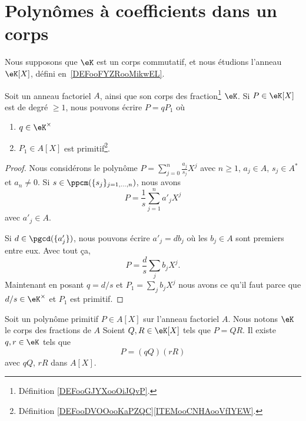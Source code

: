\section{Polynômes à coefficients dans un corps}
\label{SECooFYOGooQHitgE}

Nous supposons que \( \eK\) est un corps commutatif, et nous étudions l'anneau \( \eK[X]\), défini en~\ref{DEFooFYZRooMikwEL}.


\begin{lemma}		\label{LEMooKSTIooSTxAll}
	Soit un anneau factoriel \( A\), ainsi que son corps des fraction\footnote{Définition \ref{DEFooGJYXooOiJQvP}.} \( \eK\). Si \( P\in \eK[X]\) est de degré \( \geq 1\), nous pouvons écrire \( P=qP_1\) où
	\begin{enumerate}
		\item
		      \( q\in \eK^{\times}\)
		\item
		      \( P_1\in A[X]\) est primitif\footnote{Définition \ref{DEFooDVOOooKaPZQC}\ref{ITEMooCNHAooVfIYEW}.}.
	\end{enumerate}
\end{lemma}

\begin{proof}
	Nous considérons le polynôme \( P=\sum_{j=0}^n\frac{ a_j }{ s_j }X^j\) avec \( n\geq 1\), \( a_j\in A\), \( s_j\in A^*\) et \( a_n\neq 0\). Si \( s\in \ppcm(\{ s_j \}_{j=1,\ldots,n})\), nous avons
	\begin{equation}
		P=\frac{1}{ s}\sum_{j=1}^na'_jX^j
	\end{equation}
	avec \( a'_j\in A\).

	Si \( d\in \pgcd(\{ a'_j \})\), nous pouvons écrire \( a'_j=db_j\) où les \( b_j\in A\) sont premiers entre eux. Avec tout ça,
	\begin{equation}
		P=\frac{ d }{ s }\sum_jb_jX^j.
	\end{equation}
	Maintenant en posant \( q=d/s\) et \( P_1=\sum_jb_jX^j\) nous avons ce qu'il faut parce que \( d/s\in \eK^{\times}\) et \( P_1\) est primitif.
\end{proof}


\begin{lemma}		\label{LEMooGTPJooPWkffg}
	Soit un polynôme primitif \( P\in A[X]\) sur l'anneau factoriel \( A\). Nous notons \( \eK\) le corps des fractions de \( A\) Soient \( Q,R\in \eK[X]\) tels que \( P=QR\). Il existe \( q,r\in \eK\) tels que
	\begin{equation}
		P=(qQ)(rR)
	\end{equation}
	avec \( qQ\), \( rR\) dans \( A[X]\).
\end{lemma}

